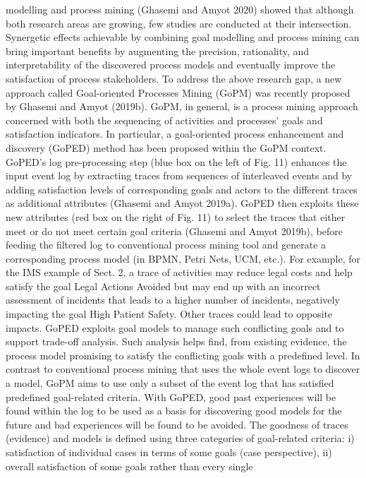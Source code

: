 modelling and process mining (Ghasemi and
Amyot 2020) showed that although both research
areas are growing, few studies are conducted at
their intersection. Synergetic effects achievable
by combining goal modelling and process mining
can bring important benefits by augmenting the
precision, rationality, and interpretability of the
discovered process models and eventually improve
the satisfaction of process stakeholders.
To address the above research gap, a new approach called Goal-oriented Processes Mining
(GoPM) was recently proposed by Ghasemi and
Amyot (2019b). GoPM, in general, is a process
mining approach concerned with both the sequencing of activities and processes’ goals and satisfaction indicators. In particular, a goal-oriented
process enhancement and discovery (GoPED)
method has been proposed within the GoPM context. GoPED’s log pre-processing step (blue box
on the left of Fig. 11) enhances the input event log
by extracting traces from sequences of interleaved
events and by adding satisfaction levels of corresponding goals and actors to the different traces as
additional attributes (Ghasemi and Amyot 2019a).
GoPED then exploits these new attributes (red box
on the right of Fig. 11) to select the traces that
either meet or do not meet certain goal criteria
(Ghasemi and Amyot 2019b), before feeding the
filtered log to conventional process mining tool
and generate a corresponding process model (in
BPMN, Petri Nets, UCM, etc.).
For example, for the IMS example of Sect. 2, a
trace of activities may reduce legal costs and help
satisfy the goal Legal Actions Avoided but may end
up with an incorrect assessment of incidents that
leads to a higher number of incidents, negatively
impacting the goal High Patient Safety. Other
traces could lead to opposite impacts. GoPED
exploits goal models to manage such conflicting
goals and to support trade-off analysis. Such
analysis helps find, from existing evidence, the
process model promising to satisfy the conflicting goals with a predefined level. In contrast to
conventional process mining that uses the whole
event logs to discover a model, GoPM aims to use
only a subset of the event log that has satisfied
predefined goal-related criteria. With GoPED,
good past experiences will be found within the log
to be used as a basis for discovering good models
for the future and bad experiences will be found
to be avoided.
The goodness of traces (evidence) and models
is defined using three categories of goal-related
criteria: i) satisfaction of individual cases in terms
of some goals (case perspective), ii) overall satisfaction of some goals rather than every single
